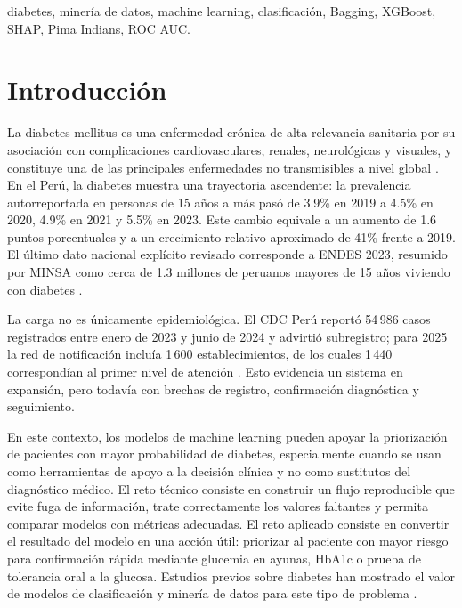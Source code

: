 \documentclass[conference]{IEEEtran}
\begin{document}
\begin{IEEEkeywords}
diabetes, minería de datos, machine learning, clasificación, Bagging, XGBoost, SHAP, Pima Indians, ROC AUC.
\end{IEEEkeywords}

\section{Introducción}

La diabetes mellitus es una enfermedad crónica de alta relevancia sanitaria por su asociación con complicaciones cardiovasculares, renales, neurológicas y visuales, y constituye una de las principales enfermedades no transmisibles a nivel global \cite{idf2021,who2021}. En el Perú, la diabetes muestra una trayectoria ascendente: la prevalencia autorreportada en personas de 15 años a más pasó de 3.9\% en 2019 a 4.5\% en 2020, 4.9\% en 2021 y 5.5\% en 2023. Este cambio equivale a un aumento de 1.6 puntos porcentuales y a un crecimiento relativo aproximado de 41\% frente a 2019. El último dato nacional explícito revisado corresponde a ENDES 2023, resumido por MINSA como cerca de 1.3 millones de peruanos mayores de 15 años viviendo con diabetes \cite{minsa2024,inei2023}.

La carga no es únicamente epidemiológica. El CDC Perú reportó 54\,986 casos registrados entre enero de 2023 y junio de 2024 y advirtió subregistro; para 2025 la red de notificación incluía 1\,600 establecimientos, de los cuales 1\,440 correspondían al primer nivel de atención \cite{cdc2024,cdc2025}. Esto evidencia un sistema en expansión, pero todavía con brechas de registro, confirmación diagnóstica y seguimiento.

En este contexto, los modelos de machine learning pueden apoyar la priorización de pacientes con mayor probabilidad de diabetes, especialmente cuando se usan como herramientas de apoyo a la decisión clínica y no como sustitutos del diagnóstico médico. El reto técnico consiste en construir un flujo reproducible que evite fuga de información, trate correctamente los valores faltantes y permita comparar modelos con métricas adecuadas. El reto aplicado consiste en convertir el resultado del modelo en una acción útil: priorizar al paciente con mayor riesgo para confirmación rápida mediante glucemia en ayunas, HbA1c o prueba de tolerancia oral a la glucosa. Estudios previos sobre diabetes han mostrado el valor de modelos de clasificación y minería de datos para este tipo de problema \cite{kavakiotis2017,sisodia2018}.
\end{document}
